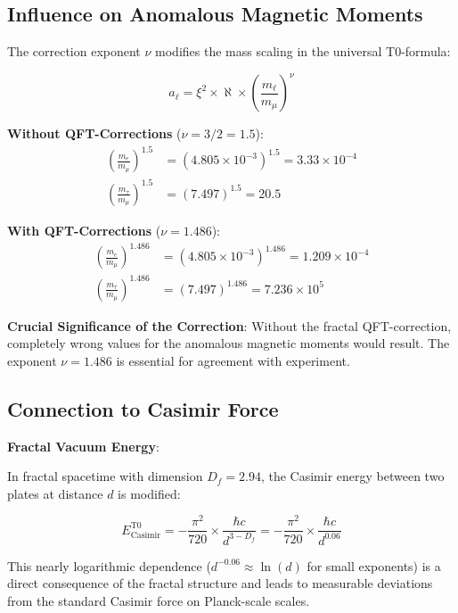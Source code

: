 \documentclass[12pt,a4paper]{article}
\newcommand{\xipar}{\xi}
\newcommand{\nulep}{\nu}
\begin{document}
	\subsection{Influence on Anomalous Magnetic Moments}
	
	The correction exponent $\nulep$ modifies the mass scaling in the universal T0-formula:
	
	\begin{equation}
		a_\ell = \xipar^2 \times \aleph \times \left(\frac{m_\ell}{m_\mu}\right)^\nulep
	\end{equation}
	
	\textbf{Without QFT-Corrections} ($\nulep = 3/2 = 1{.}5$):
	\begin{align}
		\left(\frac{m_e}{m_\mu}\right)^{1{.}5} &= (4{.}805 \times 10^{-3})^{1{.}5} = 3{.}33 \times 10^{-4} \\
		\left(\frac{m_\tau}{m_\mu}\right)^{1{.}5} &= (7{.}497)^{1{.}5} = 20{.}5
	\end{align}
	
	\textbf{With QFT-Corrections} ($\nulep = 1{.}486$):
	\begin{align}
		\left(\frac{m_e}{m_\mu}\right)^{1{.}486} &= (4{.}805 \times 10^{-3})^{1{.}486} = 1{.}209 \times 10^{-4} \\
		\left(\frac{m_\tau}{m_\mu}\right)^{1{.}486} &= (7{.}497)^{1{.}486} = 7{.}236 \times 10^5
	\end{align}
	
	\textbf{Crucial Significance of the Correction}: Without the fractal QFT-correction, completely wrong values for the anomalous magnetic moments would result. The exponent $\nulep = 1{.}486$ is essential for agreement with experiment.
	
	\subsection{Connection to Casimir Force}
	
	\textbf{Fractal Vacuum Energy}:
	
	In fractal spacetime with dimension $D_f = 2{.}94$, the Casimir energy between two plates at distance $d$ is modified:
	
	\begin{equation}
		E_{\text{Casimir}}^{\text{T0}} = -\frac{\pi^2}{720} \times \frac{\hbar c}{d^{3-D_f}} = -\frac{\pi^2}{720} \times \frac{\hbar c}{d^{0{.}06}}
	\end{equation}
	
	This nearly logarithmic dependence ($d^{-0{.}06} \approx \ln(d)$ for small exponents) is a direct consequence of the fractal structure and leads to measurable deviations from the standard Casimir force on Planck-scale scales.
	
\end{document}
